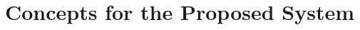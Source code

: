 \section{Concepts for the Proposed System}
\subsection{}
\subsection{}
\subsection{}
\subsection{}
\subsection{}
\subsection{}
\subsection{}
\subsection{}